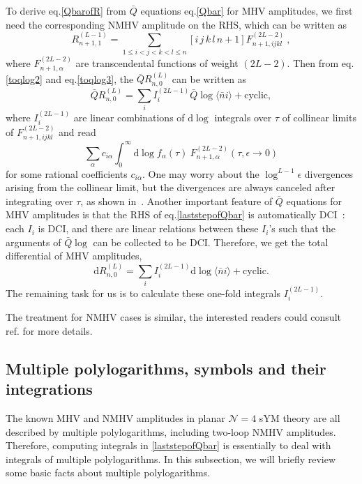 \documentclass[a4paper,12pt]{article}
\newcommand{\dif}{\mathrm{d}} %
\begin{document}
To derive eq.\eqref{QbarofR} from $\bar Q$ equations eq.\eqref{Qbar} for MHV amplitudes, we first need the corresponding NMHV amplitude on the RHS, which can be written as  
\begin{equation*}
   R_{n+1,1}^{(L-1)}= \sum_{1\leq i<j<k<l\leq n} [i\,j\,k\,l\, n+1] F^{(2L-2)}_{n+1,ijkl} \:,
\end{equation*} 
where $F^{(2L-2)}_{n+1,\alpha}$ are transcendental functions of weight $(2L{-}2)$. Then from eq.\eqref{toqlog2} and eq.\eqref{toqlog3}, the $\bar Q R_{n,0}^{(L)}$ can be written as 
\begin{equation}
    \bar Q R_{n,0}^{(L)}= \sum_{i} I^{(2L-1)}_i \bar Q \log \langle \bar n i\rangle+\text{cyclic},
\end{equation} 
where $I_i^{(2L-1)}$ are linear combinations of $\dif\log$ integrals over $\tau$ of collinear limits of $F^{(2L-2)}_{n+1,ijkl}$ and read
\begin{equation} \label{laststepofQbar}
    \sum_\alpha c_{i\alpha} \int_0^\infty \mathrm{d}\log f_\alpha(\tau)~F^{(2L-2)}_{n{+}1,\alpha} (\tau, \epsilon\to 0)
\end{equation}
for some rational coefficients $c_{i\alpha}$.
One may worry about the $\log^{L-1}\epsilon$ divergences arising from the collinear limit, but the divergences are always canceled after integrating over $\tau$, as shown in~\cite{CaronHuot:2011kk}.
Another important feature of $\bar Q$ equations for MHV amplitudes is that the RHS of eq.\eqref{laststepofQbar} is automatically DCI~\cite{CaronHuot:2011kk}: each $I_i$ is DCI, and there are linear relations between these $I_i$'s such that the arguments of $\bar Q\log$ can be collected to be DCI. Therefore, we get the total differential of MHV amplitudes,
\begin{equation}
    \dif R_{n,0}^{(L)}= \sum_{i} I^{(2L-1)}_i \dif \log \langle \bar n i\rangle+\text{cyclic}.
\end{equation} 
The remaining task for us is to calculate these one-fold integrals $I^{(2L-1)}_i$.

The treatment for NMHV cases is similar, the interested readers could consult ref.\cite{He:2020vob} for more details.

\subsection{Multiple polylogarithms, symbols and their integrations}\label{sec:2.2}

The known MHV and NMHV amplitudes in planar $\mathcal N=4$ sYM theory are all described by multiple polylogarithms, including two-loop NMHV amplitudes. Therefore, computing integrals in \eqref{laststepofQbar} is essentially to deal with integrals of multiple polylogarithms. In this subsection, we will briefly review some basic facts about multiple polylogarithms.
\end{document}
